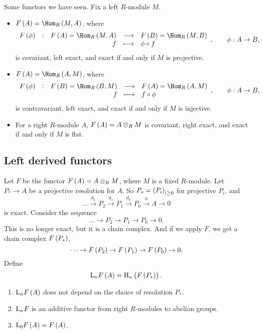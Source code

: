 \begin{example*}
Some functors we have seen. Fix a left $ R $-module $ M $.
\begin{itemize}
\item $ F\br{A} = \Hom_R\br{M, A} $, where
$$ \function[F\br{\phi}]{F\br{A} = \Hom_R\br{M, A}}{F\br{B} = \Hom_R\br{M, B}}{f}{\phi \circ f}, \qquad \phi : A \to B, $$
is covariant, left exact, and exact if and only if $ M $ is projective.
\item $ F\br{A} = \Hom_R\br{A, M} $, where
$$ \function[F\br{\phi}]{F\br{B} = \Hom_R\br{B, M}}{F\br{A} = \Hom_R\br{A, M}}{f}{f \circ \phi}, \qquad \phi : A \to B, $$
is contravariant, left exact, and exact if and only if $ M $ is injective.
\item For a right $ R $-module $ A $, $ F\br{A} = A \otimes_R M $ is covariant, right exact, and exact if and only if $ M $ is flat.
\end{itemize}
\end{example*}

\pagebreak

\subsection{Left derived functors}

Let $ F $ be the functor $ F\br{A} = A \otimes_R M $, where $ M $ is a fixed $ R $-module. Let $ P_* \to A $ be a projective resolution for $ A $. So $ P_* = \br{P_i}_{i \ge 0} $ for projective $ P_i $, and
$$ \dots \xrightarrow{d_2} P_2 \xrightarrow{d_1} P_1 \xrightarrow{d_0} P_0 \xrightarrow{\phi} A \to 0 $$
is exact. Consider the sequence
$$ \dots \to P_2 \to P_1 \to P_0 \to 0. $$
This is no longer exact, but it is a chain complex. And if we apply $ F $, we get a chain complex $ F\br{P_*} $,
$$ \dots \to F\br{P_2} \to F\br{P_1} \to F\br{P_0} \to 0. $$
Define
$$ \L_nF\br{A} = \H_n\br{F\br{P_*}}. $$

\begin{theorem}
\hfill
\begin{enumerate}
\item $ \L_nF\br{A} $ does not depend on the choice of resolution $ P_* $.
\item $ \mathrm{L}_nF $ is an additive functor from right $ R $-modules to abelian groups.
\item $ \L_0F\br{A} = F\br{A} $.
\end{enumerate}
\end{theorem}


